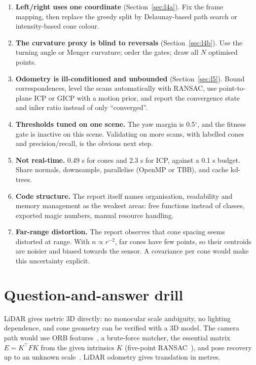 \documentclass[10pt,a4paper]{scrartcl}
\newcommand{\RuleSection}[1]{%
    \section{#1}%
    \vspace{0.2em}{\color{accent!35}\hrule height 0.4pt}\vspace{0.3em}%
  }
\begin{document}
  \begin{enumerate}
    \item \textbf{Left/right uses one coordinate} (Section~\ref{sec:l4a}). Fix the frame
      mapping, then replace the greedy split by Delaunay-based path search or
      intensity-based cone colour.
    \item \textbf{The curvature proxy is blind to reversals} (Section~\ref{sec:l4b}).
      Use the turning angle or Menger curvature; order the gates; draw all $N$
      optimised points.
    \item \textbf{Odometry is ill-conditioned and unbounded} (Section~\ref{sec:l5}).
      Bound correspondences, level the scans automatically with RANSAC, use
      point-to-plane ICP or GICP with a motion prior, and report the convergence state and
      inlier ratio instead of only ``converged''.
    \item \textbf{Thresholds tuned on one scene.} The yaw margin is 0.5$^\circ$, and the
      fitness gate is inactive on this scene. Validating on more scans, with labelled
      cones and precision/recall, is the obvious next step.
    \item \textbf{Not real-time.} 0.49 s for cones and 2.3 s for ICP, against a 0.1 s budget.
      Share normals, downsample, parallelise (OpenMP or TBB), and cache kd-trees.
    \item \textbf{Code structure.} The report itself names organisation, readability and
      memory management as the weakest areas: free functions instead of classes,
      exported magic numbers, manual resource handling.
    \item \textbf{Far-range distortion.} The report observes that cone spacing seems
      distorted at range. With $n\propto r^{-2}$, far cones have few points, so their
      centroids are noisier and biased towards the sensor. A covariance per cone would make
      this uncertainty explicit.
  \end{enumerate}

  \RuleSection{Question-and-answer drill}
  \label{sec:qa}

  \begin{askbox}
  \small LiDAR gives metric 3D directly: no monocular scale ambiguity, no lighting
  dependence, and cone geometry can be verified with a 3D model. The camera path would
  use ORB features~\citep{rublee2011orb}, a brute-force matcher, the essential matrix
  $E=K^\top FK$ from the given intrinsics $K$ (five-point RANSAC~\citep{nister2004efficient,fischler1981ransac}),
  and pose recovery up to an unknown scale~\citep{hartley2004multiple}. LiDAR odometry
  gives translation in metres.
  \end{askbox}
\end{document}
